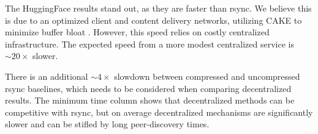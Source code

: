 


The HuggingFace results stand out, as they are faster than rsync.
We believe this is due to an optimized client and content delivery networks, utilizing CAKE
  \cite{hoiland2018piece} to minimize buffer bloat \cite{gettys2012bufferbloat}.
However, this speed relies on costly centralized infrastructure.
The expected speed from a more modest centralized service is $\sim\!20\times$ slower.

There is an additional $\sim\!4\times$  slowdown between compressed and uncompressed rsync baselines, which needs to be
  considered when comparing decentralized results.
The minimum time column shows that decentralized methods can be competitive with rsync, but on
  average decentralized mechanisms are significantly slower and can be stifled by long peer-discovery times.



